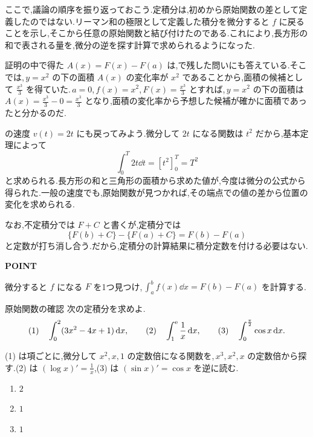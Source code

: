 ここで,議論の順序を振り返っておこう.定積分は,初めから原始関数の差として定義したのではない.リーマン和の極限として定義した積分を微分すると $f$ に戻ることを示し,そこから任意の原始関数と結び付けたのである.これにより,長方形の和で表される量を,微分の逆を探す計算で求められるようになった.

証明の中で得た $A(x)=F(x)-F(a)$ は,で残した問いにも答えている.そこでは,\,$y=x^2$ の下の面積 $A(x)$ の変化率が $x^2$ であることから,面積の候補として $\frac{x^3}{3}$ を得ていた.\,$a=0$,\,$f(x)=x^2$,\,$F(x)=\frac{x^3}{3}$ とすれば,\,$y=x^2$ の下の面積は $A(x)=\frac{x^3}{3}-0=\frac{x^3}{3}$ となり,面積の変化率から予想した候補が確かに面積であったと分かるのだ.

の速度 $v(t)=2t$ にも戻ってみよう.微分して $2t$ になる関数は $t^2$ だから,基本定理によって
\[
 \int_0^T2t\dd t=[t^2]_0^T=T^2
\]
と求められる.長方形の和と三角形の面積から求めた値が,今度は微分の公式から得られた.一般の速度でも,原始関数が見つかれば,その端点での値の差から位置の変化を求められる.

なお,不定積分では $F+C$ と書くが,定積分では
\[
 \{F(b)+C\}-\{F(a)+C\}=F(b)-F(a)
\]
と定数が打ち消し合う.だから,定積分の計算結果に積分定数を付ける必要はない.

\begin{bookpoint}
\textbf{POINT}\par
微分すると $f$ になる $F$ を1つ見つけ,\,$\int_a^b f(x)\dd x=F(b)-F(a)$ を計算する.
\end{bookpoint}

\begin{example}{原始関数の確認}
次の定積分を求めよ.
\[
 \text{(1)}\quad\int_0^2(3x^2-4x+1)\,\mathrm{d} x,\qquad
 \text{(2)}\quad\int_1^{\mathrm{e}}\frac1x\,\mathrm{d} x,\qquad
 \text{(3)}\quad\int_0^{\frac\pi2}\cos x\,\mathrm{d} x.
\]
\end{example}
(1) は項ごとに,微分して $x^2,x,1$ の定数倍になる関数を,\,$x^3,x^2,x$ の定数倍から探す.(2) は $(\log x)'=\frac1x$,(3) は $(\sin x)'=\cos x$ を逆に読む.

\begin{enumerate}[label=(\arabic*),leftmargin=*]
 \item $2$
 \item $1$
 \item $1$
\end{enumerate}

